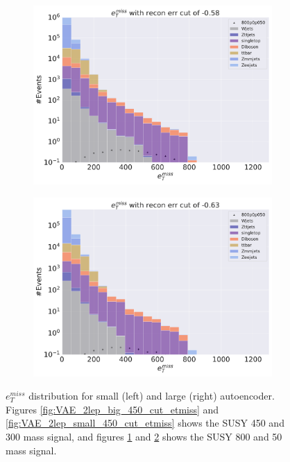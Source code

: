 \begin{figure}[H]
    \hfill
    \begin{subfigure}{.45\textwidth}
        \includegraphics[width=\textwidth]{Figures/VAE_testing/big/2lep/b_data_recon_big_rm3_feats_sig_800p0p050_recon_errcut_-0.58.pdf}
        \caption{}
        \label{fig:VAE_2lep_big_800_cut_etmiss}
    \end{subfigure}
    \hfill   
    \begin{subfigure}{.45\textwidth}
        \includegraphics[width=\textwidth]{Figures/VAE_testing/small/2lep/b_data_recon_big_rm3_feats_sig_800p0p050_recon_errcut_-0.63.pdf}
        \caption{}
        \label{fig:VAE_2lep_small_800_cut_etmiss}
    \end{subfigure}
    \hfill      
    \caption[Some $e_T^{miss}$ cuts for VAE]{$e_T^{miss}$ distribution for small (left) and large (right) autoencoder.
    Figures \ref{fig:VAE_2lep_big_450_cut_etmiss} and \ref{fig:VAE_2lep_small_450_cut_etmiss} shows the SUSY 450 and 300 mass signal, 
    and figures \ref{fig:VAE_2lep_big_800_cut_etmiss} and \ref{fig:VAE_2lep_small_800_cut_etmiss} shows the SUSY 800 and 50 mass signal.}
    \label{fig:VAE_2lep_recon_err_both_sig_cut_etmiss}
\end{figure}


